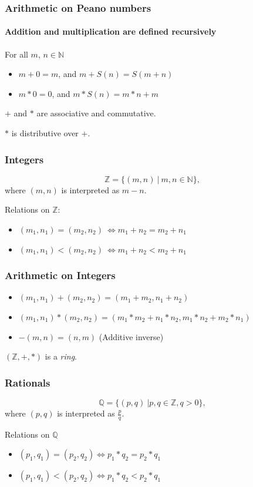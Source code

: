 \documentclass{beamer}
\def\N{\mathbb{N}}
\def\Q{\mathbb{Q}}
\def\Z{\mathbb{Z}}
\begin{document}
\begin{frame}
    \frametitle{Arithmetic on Peano numbers}
    \framesubtitle{Addition and multiplication are defined recursively}
    For all $m$, $n \in \N$
    \begin{itemize}
        \item $m+0 = m$, and $m+S(n) = S(m+n)$
        \item $m * 0 = 0$, and $m * S(n) = m*n + m$
    \end{itemize}

    \vspace{2.5em}
    $+$ and $*$ are associative and commutative. 

    $*$ is distributive over $+$.
\end{frame}

\begin{frame}
    \frametitle{Integers}
    $$\Z = \{ (m,n) ~|~m,n \in \N \}, $$ 
    where $(m,n)$ is interpreted as $m-n$.

    \vspace{2.5em}
    Relations on $\Z$:
    \begin{itemize}
        \item $(m_1,n_1) = (m_2,n_2) ~\Leftrightarrow m_1 + n_2 = m_2 + n_1$
        \item $(m_1,n_1) < (m_2,n_2) ~\Leftrightarrow m_1 + n_2 < m_2 + n_1$
    \end{itemize}
\end{frame}

\begin{frame}
    \frametitle{Arithmetic on Integers}
    \begin{itemize}
        \item $(m_1,n_1) + (m_2,n_2) = (m_1+m_2, n_1+n_2) $
        \item $(m_1,n_1) * (m_2,n_2) = (m_1*m_2 + n_1*n_2, m_1*n_2 + m_2*n_1)$
        \item $-(m,n) = (n,m)$ (Additive inverse)
    \end{itemize}

    \vspace{2.5em}
    $(\Z, +, *)$ is a \textit{ring}.
\end{frame}

\begin{frame}
    \frametitle{Rationals}
    $$ \Q = \{ (p,q)~| p,q \in \Z, q > 0 \}, $$
    where $(p,q)$ is interpreted as $\frac{p}{q}$.

    \vspace{2.5em}
    Relations on $\Q$
    \begin{itemize}
        \item $(p_1, q_1) = (p_2,q_2) \Leftrightarrow p_1 * q_2 = p_2 * q_1$
        \item $(p_1, q_1) < (p_2,q_2) \Leftrightarrow p_1 * q_2 < p_2 * q_1$
    \end{itemize}
\end{frame}
\end{document}
